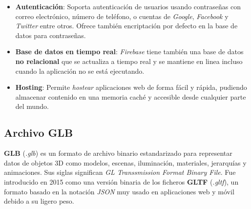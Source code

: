 \begin{itemize}
    \item \textbf{Autenticación}: Soporta autenticación de usuarios usando contraseñas con correo electrónico, número de teléfono, o cuentas de \textit{Google}, \textit{Facebook} y \textit{Twitter} entre otros. Ofrece también encriptación por defecto en la base de datos para contraseñas.
    \item \textbf{Base de datos en tiempo real}: \textit{Firebase} tiene también una base de datos \textbf{no relacional} que se actualiza a tiempo real y se mantiene en linea incluso cuando la aplicación no se está ejecutando.
    \item \textbf{Hosting}: Permite \textit{hostear} aplicaciones web de forma fácil y rápida, pudiendo almacenar contenido en una memoria caché y accesible desde cualquier parte del mundo.
\end{itemize}

\subsection{Archivo GLB}
\textbf{GLB} (\textit{.glb}) es un formato de archivo binario estandarizado para representar datos de objetos 3D como modelos, escenas, iluminación, materiales, jerarquías y animaciones. Sus siglas significan \textit{GL Transsmission Format Binary File}. Fue introducido en 2015 como una versión binaria de los ficheros \textbf{GLTF} (\textit{.gltf}), un formato basado en la notación \textit{JSON} muy usado en aplicaciones web y móvil debido a su ligero peso.